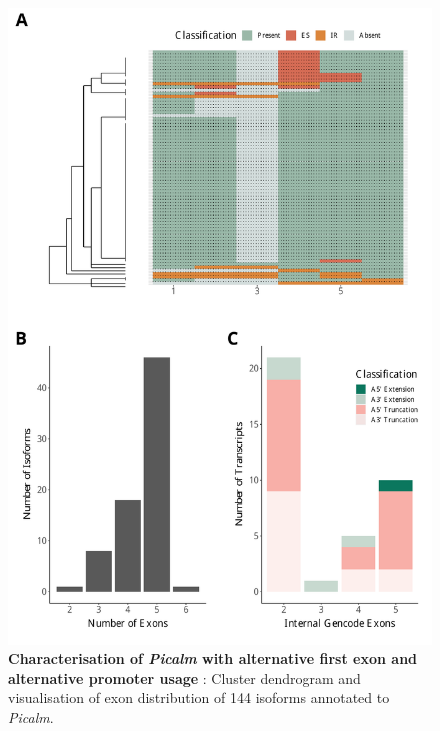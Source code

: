\begin{figure}[htp]
	\begin{center}
		\includegraphics[page=11,trim={1cm 20cm 0 2cm},scale = 0.55]{Figures/TargetGenes.pdf}
	\end{center}
	\captionsetup{width=0.95\textwidth}
	\caption[Characterisation of \textit{Picalm} with alternative first exon and alternative promoter usage]%
	{\textbf{Characterisation of \textit{Picalm} with alternative first exon and alternative promoter usage }: Cluster dendrogram and visualisation of exon distribution of 144 isoforms annotated to \textit{Picalm}.
	}   
	\label{fig:picalm}
\end{figure}

